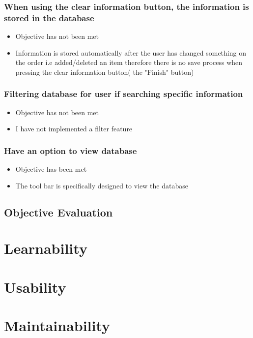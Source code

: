 \subsubsection{When using the clear information button, the information is stored in the database}
\begin{itemize}
	\item Objective has not been met
	\item Information is stored automatically after the user has changed something on the order i.e added/deleted an item therefore there is no save process when pressing the clear information button( the "Finish" button)
\end{itemize}

\subsubsection{Filtering database for user if searching specific information}
\begin{itemize}
	\item Objective has not been met
	\item I have not implemented a filter feature
\end{itemize}

\subsubsection{Have an option to view database}
\begin{itemize}
	\item Objective has been met
	\item The tool bar is specifically designed to view the database
\end{itemize}
\subsection{Objective Evaluation}

\section{Learnability}

\section{Usability}

\section{Maintainability}

